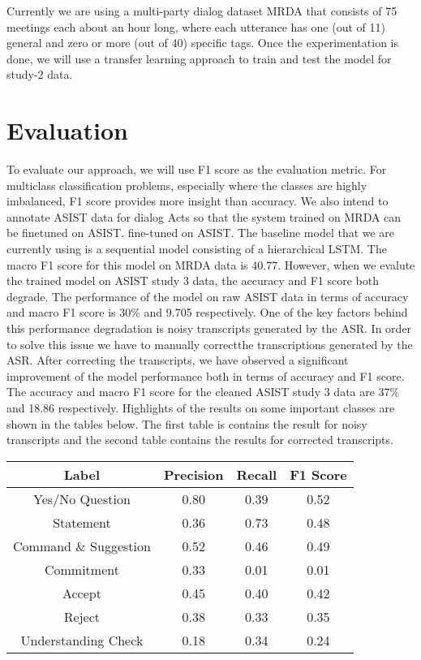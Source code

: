 Currently we are using a multi-party dialog dataset MRDA
\citep{Shriberg.ea:2004} that consists of 75 meetings each about an hour long,
where each utterance has one (out of 11) general and zero or more (out of 40)
specific tags. Once the experimentation is done, we will use a transfer
learning approach to train and test the model for study-2 data. 

\section{Evaluation}

To evaluate our approach, we will use F1 score as the evaluation metric. For
multiclass classification problems, especially where the classes are highly
imbalanced, F1 score provides more insight than accuracy.  We also intend to
annotate ASIST data for dialog Acts so that the system trained on MRDA can be
finetuned on ASIST. fine-tuned on ASIST. The baseline model that we are currently 
using is a sequential model consisting of a hierarchical LSTM. The macro F1 score 
for this model on MRDA data is 40.77. However, when we evalute the trained model 
on ASIST study 3 data, the accuracy and F1 score both degrade. The performance of 
the model on raw ASIST data in terms of accuracy and macro F1 score is 30\% and 
9.705 respectively. One of the key factors behind this performance degradation is 
noisy transcripts generated by the ASR. In order to solve this issue we have to 
manually correctthe transcriptions generated by the ASR. After correcting the 
transcripts, we have observed a significant improvement of the model performance 
both in terms of accuracy and F1 score. The accuracy and macro F1 score for the 
cleaned ASIST study 3 data are 37\% and 18.86 respectively. Highlights of the results
on some important classes are shown in the tables below. The first table is contains
the result for noisy transcripts and the second table contains the results for 
corrected transcripts.

\begin{center}
\begin{tabular}{||c c c c||}
 \hline
 Label & Precision & Recall & F1 Score\\ [0.5ex]
 \hline\hline
 Yes/No Question & 0.80 & 0.39  & 0.52\\
 \hline
 Statement & 0.36 & 0.73 & 0.48\\
 \hline
 Command \& Suggestion & 0.52 & 0.46 & 0.49\\
 \hline
 Commitment & 0.33 & 0.01 & 0.01\\
 \hline
 Accept & 0.45 & 0.40 &  0.42 \\
 \hline
  Reject & 0.38 & 0.33 & 0.35\\
 \hline
  Understanding Check & 0.18 & 0.34 & 0.24\\
 \hline
\end{tabular}
\end{center}


